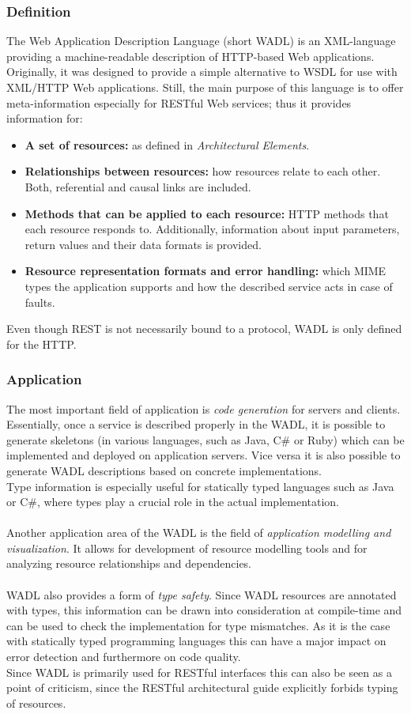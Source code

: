 \subsubsection{Definition}
The Web Application Description Language (short WADL) is an XML-language providing a machine-readable description of HTTP-based  Web applications. Originally, it was designed to provide a simple alternative to WSDL for use with XML/HTTP Web applications. Still, the main purpose of this language is to offer meta-information especially for RESTful Web services; thus it provides information for: 
\begin{itemize}
\item{{\bf A set of resources:} as defined in \emph{Architectural Elements}.}
\item{{\bf Relationships between resources:} how resources relate to each other. Both, referential and causal links are included.}
\item{{\bf Methods that can be applied to each resource:} HTTP methods that each resource responds to. Additionally, information about input parameters, return values and their data formats is provided.}
\item{{\bf Resource representation formats and error handling:} which MIME types the application supports and how the described service acts in case of faults. \cite{WADL}}
\end{itemize}
Even though REST is not necessarily bound to a protocol, WADL is only defined for the HTTP.
\subsubsection{Application}
The most important field of application is \emph{code generation} for servers and clients. Essentially, once a service is described properly in the WADL, it is possible to generate skeletons (in various languages, such as Java, C\# or Ruby) which can be implemented and deployed on application servers. Vice versa it is also possible to generate WADL descriptions based on concrete implementations.
\\
Type information is especially useful for statically typed languages such as Java or C\#, where types play a crucial role in the actual implementation.
\\ \\
Another application area of the WADL is the field of \emph{application modelling and visualization}. It allows for development of resource modelling tools and for analyzing resource relationships and dependencies. \cite{WADL}
\\ \\
WADL also provides a form of \emph{type safety}. Since WADL resources are annotated with types, this information can be drawn into consideration at compile-time and can be used to check the implementation for type mismatches. As it is the case with statically typed programming languages this can have a major impact on error detection and furthermore on code quality.
\\
Since WADL is primarily used for RESTful interfaces this can also be seen as a point of criticism, since the RESTful architectural guide explicitly forbids typing of resources.

